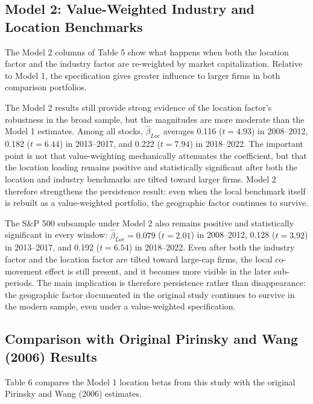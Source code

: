 \documentclass[
  12pt,
]{article}
\begin{document}
\subsection{Model 2: Value-Weighted Industry and Location
Benchmarks}\label{model-2-value-weighted-industry-and-location-benchmarks}

The Model 2 columns of Table 5 show what happens when both the location
factor and the industry factor are re-weighted by market capitalization.
Relative to Model 1, the specification gives greater influence to larger
firms in both comparison portfolios.

The Model 2 results still provide strong evidence of the location
factor's robustness in the broad sample, but the magnitudes are more
moderate than the Model 1 estimates. Among all stocks,
\(\hat{\beta}_{Loc}\) averages 0.116 (\(t=4.93\)) in 2008--2012, 0.182
(\(t=6.44\)) in 2013--2017, and 0.222 (\(t=7.94\)) in 2018--2022. The
important point is not that value-weighting mechanically attenuates the
coefficient, but that the location loading remains positive and
statistically significant after both the location and industry
benchmarks are tilted toward larger firms. Model 2 therefore strengthens
the persistence result: even when the local benchmark itself is rebuilt
as a value-weighted portfolio, the geographic factor continues to
survive.

The S\&P 500 subsample under Model 2 also remains positive and
statistically significant in every window: \(\hat{\beta}_{Loc}=0.079\)
(\(t=2.01\)) in 2008--2012, 0.128 (\(t=3.92\)) in 2013--2017, and 0.192
(\(t=6.54\)) in 2018--2022. Even after both the industry factor and the
location factor are tilted toward large-cap firms, the local co-movement
effect is still present, and it becomes more visible in the later
sub-periods. The main implication is therefore persistence rather than
disappearance: the geographic factor documented in the original study
continues to survive in the modern sample, even under a value-weighted
specification.

\subsection{Comparison with Original Pirinsky and Wang (2006)
Results}\label{comparison-with-original-pirinsky-and-wang-2006-results}

Table 6 compares the Model 1 location betas from this study with the
original Pirinsky and Wang (2006) estimates.
\end{document}

